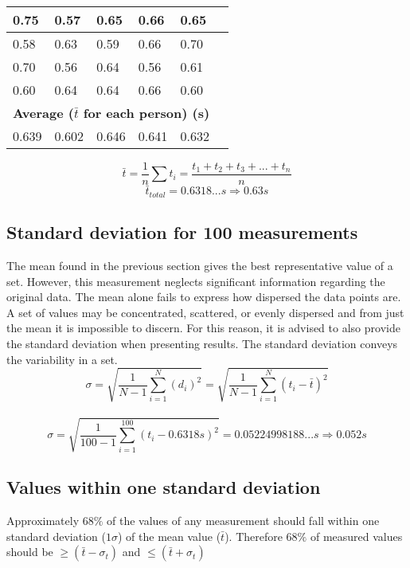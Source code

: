 \documentclass[11pt, letterpaper, includehead]{article}
\begin{document}
\begin{center}
\begin{tabular}{|   m{2cm}  |  m{2cm}  |  m{2cm}  |  m{2cm}  |  m{2cm}  |  m{2cm}  | }
    \hline
    0.75          & 0.57           & 0.65         & 0.66               & 0.65          \\
    \hline
    0.58          & 0.63           & 0.59         & 0.66               & 0.70          \\
    \hline
    0.70          & 0.56           & 0.64         & 0.56               & 0.61          \\
    \hline
    0.60          & 0.64           & 0.64         & 0.66               & 0.60          \\
    \hline
    \hline
    \multicolumn{5}{|c|}{\textbf{Average ($\bar{t}$ for each person) (s)}} \\
    \hline
    0.639         & 0.602          & 0.646        & 0.641              & 0.632         \\
    \hline
  \end{tabular}
\end{center}
$$\bar{t} = \frac{1}{n}\sum t_i = \frac{t_1 + t_2 + t_3 + ... + t_n}{n}$$
$$\bar{t}_{total} = 0.6318...s \Rightarrow \boxed{0.63s}$$

\subsection{Standard deviation for 100 measurements} %
The mean found in the previous section gives the best representative
value of a set. However, this measurement neglects significant
information regarding the original data. The mean alone fails to
express how dispersed the data points are. A set of values may be
concentrated, scattered, or evenly dispersed and from just the mean it is impossible to discern.
For this reason, it is advised to also provide the standard deviation
when presenting results. The standard deviation conveys the variability in a set.
$$\sigma = \sqrt{\frac{1}{N - 1}\sum_{i = 1}^{N} (d_i)^2} = \sqrt{\frac{1}{N - 1}\sum_{i = 1}^{N} (t_i - \bar{t})^2}$$\\
$$\sigma = \sqrt{\frac{1}{100 - 1}\sum_{i = 1}^{100}(t_i - 0.6318s)^2} = 0.05224998188...s \Rightarrow \boxed{0.052s}$$


\subsection{Values within one standard deviation} %
Approximately $68\%$ of the values of any measurement should fall within one
standard deviation ($1 \sigma$) of the mean value ($\bar{t}$). Therefore $68\%$ of measured
values should be $\geq (\bar{t} - \sigma_t)$ and $\leq (\bar{t} + \sigma_t)$\\
\end{document}
